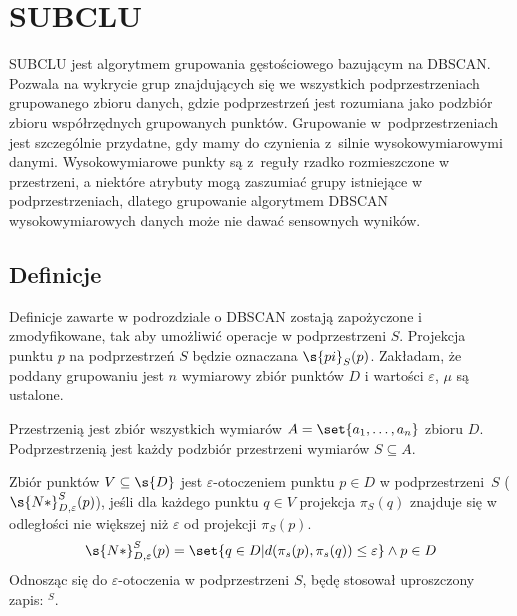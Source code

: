 \section{SUBCLU}

SUBCLU \cite{subclu} jest algorytmem grupowania gęstościowego bazującym na \linebreak DBSCAN. Pozwala na wykrycie grup znajdujących się we wszystkich podprzestrzeniach grupowanego zbioru danych, gdzie podprzestrzeń jest rozumiana jako podzbiór zbioru współrzędnych grupowanych punktów. Grupowanie \mbox{w podprzestrzeniach} jest szczególnie przydatne, gdy mamy do czynienia \mbox{z silnie} wysokowymiarowymi danymi. Wysokowymiarowe punkty są \mbox{z reguły} rzadko rozmieszczone w przestrzeni, a niektóre atrybuty mogą zaszumiać grupy istniejące w podprzestrzeniach, dlatego grupowanie algorytmem DBSCAN wysokowymiarowych danych może nie dawać sensownych wyników.

\subsection{Definicje}
Definicje zawarte w podrozdziale o DBSCAN zostają zapożyczone i zmodyfikowane, tak aby umożliwić operacje w podprzestrzeni $ S $. Projekcja punktu $ p $ na podprzestrzeń $ S $ będzie oznaczana $ \s{pi}_S(p) $. Zakładam, że poddany grupowaniu jest $ n $ wymiarowy zbiór punktów $ D $ i wartości $ \varepsilon $, $ \mu $ są ustalone.
\smallskip

\newline
 Przestrzenią jest zbiór wszystkich wymiarów $ A=\set{a_1,\dots,a_n} $ zbioru $ D $. Podprzestrzenią jest każdy podzbiór przestrzeni wymiarów $ S \subseteq A $.
\smallskip

\newline
Zbiór punktów $ V \subseteq \s{D} $ jest $ \varepsilon $-otoczeniem punktu $ p\in D $ w \mbox{podprzestrzeni $ S $} ($ \s{N*}^S_{D,\varepsilon}(p) $), jeśli dla każdego punktu $ q \in V $ projekcja $ \pi_S(q) $ znajduje się w odległości nie większej niż $ \varepsilon $ od projekcji $ \pi_S(p) $.
\begin{equation}
	\s{N*}^S_{D,\varepsilon}(p) = \set{q \in D | d(\pi_s(p), \pi_s(q)) \le \varepsilon} \land p\in D
\end{equation}
Odnosząc się do $ \varepsilon $-otoczenia w podprzestrzeni $ S $, będę stosował uproszczony zapis: \textit{$^S$}.
\smallskip

